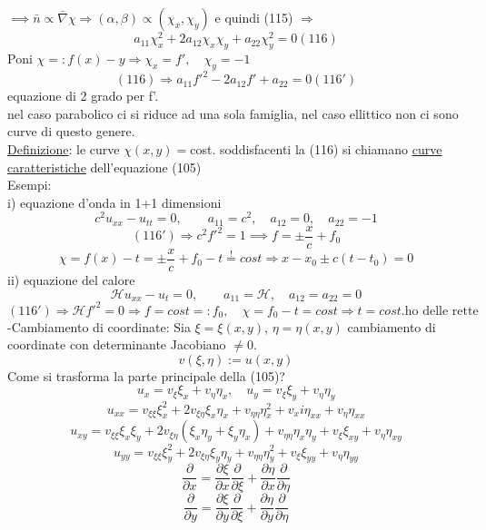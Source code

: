 \documentclass[a4paper,11pt]{report}
\begin{document}
$\implies \bar{n} \propto \bar{\nabla}\chi \Rightarrow (\alpha,\beta) \propto (\chi_x, \chi_y)$ e quindi (115) $\Rightarrow$
\begin{equation}
a_{11}\chi_x^2 + 2a_{12}\chi_x\chi_y + a_{22}\chi_y^2 =0 (116)
\end{equation}
Poni $\chi =: f(x)-y \Rightarrow \chi_x = f', \quad \chi_y=-1 $
$$
(116)\Rightarrow a_{11}f'^2 - 2 a_{12}f' + a_{22}=0 (116')
$$
equazione di 2 grado per f'.\\
nel caso parabolico ci si riduce ad una sola famiglia, nel caso ellittico non ci sono curve di questo genere.\\
\underline{Definizione}: le curve $\chi(x,y)=$cost. soddisfacenti la (116) si chiamano \underline{curve caratteristiche} dell'equazione (105)\\
Esempi:\\
i) equazione d'onda in 1+1 dimensioni
$$
c^2 u_{xx}-u_{tt}=0, \qquad a_{11}=c^2, \quad a_{12}=0, \quad a_{22}=-1
$$
$$
(116')\Rightarrow c^2f'^2 =1 \implies f=\pm \dfrac{x}{c} + f_0
$$
$$
\chi=f(x) - t= \pm \dfrac{x}{c}+f_0 -t \overset{!}{=}cost \Rightarrow x-x_0 \pm c(t-t_0)=0
$$
ii) equazione del calore 
$$
\mathcal{H}u_{xx}- u_t=0, \qquad a_{11}=\mathcal{H}, \quad a_{12}=a_{22}=0
$$
$$
(116')\Rightarrow \mathcal{H} f'^2 =0 \Rightarrow f=cost=:f_0, \quad \chi = f_0-t=cost \Rightarrow t=cost. \text{ho delle rette}
$$
-Cambiamento di coordinate:
Sia $\xi=\xi(x,y)$, $\eta=\eta(x,y)$ cambiamento di coordinate con determinante Jacobiano $\neq 0$.
$$
v(\xi,\eta):=u(x,y)
$$
Come si trasforma la parte principale della (105)?
$$
u_x=v_\xi \xi_x + v_\eta \eta_x,\quad u_y=v_\xi \xi_y + v_\eta \eta_y
$$
$$
u_{xx}=v_{\xi \xi}\xi_x^2 + 2v_{\xi\eta}\xi_x\eta_x + v_{\eta\eta}\eta_x^2 + v_xi\eta_{xx} +v_\eta \eta_{xx}
$$
$$
u_{xy}= v_{\xi \xi}\xi_x\xi_y + 2v_{\xi\eta}(\xi_x\eta_y + \xi_y\eta_x) + v_{\eta\eta} \eta_x\eta_y + v_\xi \xi_{xy} + v_\eta \eta_{xy}
$$
$$
u_{yy}= v_{\xi\xi }\xi_y^2 + 2v_{\xi\eta}\xi_y\eta_y + v_{\eta\eta}\eta_y^2 + v_\xi \xi_{yy} + v_\eta \eta_{yy}
$$
$$
\dfrac{\partial}{\partial x} = \dfrac{\partial \xi}{\partial x}\dfrac{\partial}{\partial \xi} + \dfrac{\partial \eta}{\partial x}\dfrac{\partial}{\partial \eta}
$$
$$
\dfrac{\partial}{\partial y} = \dfrac{\partial \xi}{\partial y}\dfrac{\partial}{\partial \xi} + \dfrac{\partial \eta}{\partial y}\dfrac{\partial}{\partial \eta}
$$
\end{document}

